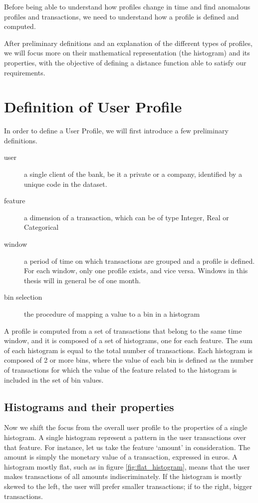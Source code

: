
Before being able to understand how profiles change in time and find anomalous profiles and transactions, we need to understand how a profile is defined and computed.

After preliminary definitions and an explanation of the different types of profiles, we will focus more on their mathematical representation (the histogram) and its properties, with the objective of defining a distance function able to satisfy our requirements.

\section{Definition of User Profile}

In order to define a User Profile, we will first introduce a few preliminary definitions.

\begin{description}
  \item[user] a single client of the bank, be it a private or a company, identified by a unique code in the dataset.
  \item[feature] a dimension of a transaction, which can be of type Integer, Real or Categorical
  \item[window] a period of time on which transactions are grouped and a profile is defined. For each window, only one profile exists, and vice versa. Windows in this thesis will in general be of one month.
  \item[bin selection] the procedure of mapping a value to a bin in a histogram
\end{description}

A profile is computed from a set of transactions that belong to the same time window, and it is composed of a set of histograms, one for each feature. The sum of each histogram is equal to the total number of transactions. Each histogram is composed of 2 or more bins, where the value of each bin is defined as the number of transactions for which the value of the feature related to the histogram is included in the set of bin values.

\subsection{Histograms and their properties}

Now we shift the focus from the overall user profile to the properties of a single histogram. A single histogram represent a pattern in the user transactions over that feature. For instance, let us take the feature `amount' in consideration. The amount is simply the monetary value of a transaction, expressed in euros. A histogram mostly flat, such as in figure \ref{fig:flat_histogram}, means that the user makes transactions of all amounts indiscriminately. If the histogram is mostly skewed to the left, the user will prefer smaller transactions; if to the right, bigger transactions.

